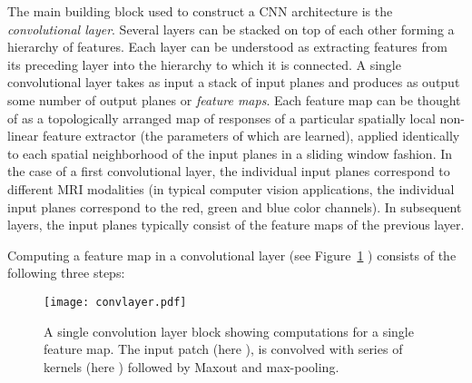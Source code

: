 \documentclass[final,5p,times,twocolumn]{elsarticle}
\begin{document}
The main building block used to construct a CNN architecture is the {\it convolutional layer}. Several layers can be stacked on top of each other forming a hierarchy of features. Each layer can be understood as extracting features from its preceding layer into the hierarchy to which it is connected. A single convolutional layer takes as input a stack of input planes and produces as output some number of output planes or \textit{feature maps}. Each feature map can be thought of as a topologically arranged map of responses of a particular spatially local non-linear feature extractor (the parameters of which are learned), applied identically to each spatial neighborhood of the input planes in a sliding window fashion.  In the case of a first convolutional layer, the individual input planes correspond to different MRI modalities (in typical computer vision applications, the individual input planes correspond to the red, green and blue color channels). In subsequent layers, the input planes typically consist of the feature maps of the previous layer.

Computing a feature map in a convolutional layer (see Figure~\ref{fig::convlayer} ) consists of the following three steps:


\begin{figure}

\centering

\texttt{[image: convlayer.pdf]}

\caption{A single convolution layer block showing computations for a single feature map. The input patch (here ), is convolved with series of kernels (here ) followed by Maxout and max-pooling. }

\label{fig::convlayer}
\end{figure}
\end{document}
